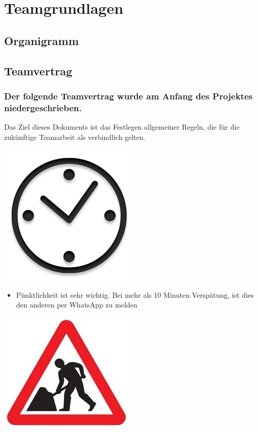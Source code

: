 \chapter{Teamgrundlagen}

\section{Organigramm}

\section{Teamvertrag}

\subsection{Der folgende Teamvertrag wurde am Anfang des Projektes niedergeschrieben.}

Das Ziel dieses Dokuments ist das Festlegen allgemeiner Regeln, die für die zukünftige Teamarbeit als verbindlich gelten.\\

\begin{center}
\includegraphics[scale=0.25]{img/clock}\\
\end{center}


\begin{itemize}
\item Pünktlichkeit ist sehr wichtig. Bei mehr als 10 Minuten Verspätung, ist dies den anderen per WhatsApp zu melden
\end{itemize}

\begin{center}
\includegraphics[scale=1.1]{img/work}\\
\end{center}

